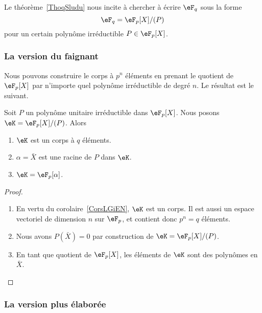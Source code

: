 Le théorème~\ref{ThoqSludu} nous incite à chercher à écrire \( \eF_q\) sous la forme
\begin{equation}
	\eF_q=\eF_p[X]/(P)
\end{equation}
pour un certain polynôme irréductible \( P\in\eF_p[X]\).

\subsubsection{La version du faignant}

Nous pouvons construire le corps à \( p^n\) éléments en prenant le quotient de \( \eF_p[X]\) par n'importe quel polynôme irréductible de degré \( n\). Le résultat est le suivant.
\begin{proposition} \label{PropHfrNCB}
	Soit \( P\) un polynôme unitaire irréductible dans \( \eF_p[X]\). Nous posons \( \eK=\eF_p[X]/(P)\). Alors
	\begin{enumerate}
		\item
		      \( \eK\) est un corps à \( q\) éléments.
		\item
		      \( \alpha=\bar X\) est une racine de \( P\) dans \( \eK\).
		\item   \label{ItemiEFRTg}
		      \( \eK=\eF_p[\alpha]\).
	\end{enumerate}
\end{proposition}

\begin{proof}
	\begin{enumerate}
		\item
		      En vertu du corolaire~\ref{CorsLGiEN}, \( \eK\) est un corps. Il est aussi un espace vectoriel de dimension \( n\) sur \( \eF_p\), et contient donc \( p^n=q\) éléments.
		\item
		      Nous avons \( P(\bar X)=0\) par construction de \( \eK=\eF_p[X]/(P)\).
		\item
		      En tant que quotient de \( \eF_p[X]\), les éléments de \( \eK\) sont des polynômes en \( \bar X\).
	\end{enumerate}
\end{proof}

\subsubsection{La version plus élaborée}

